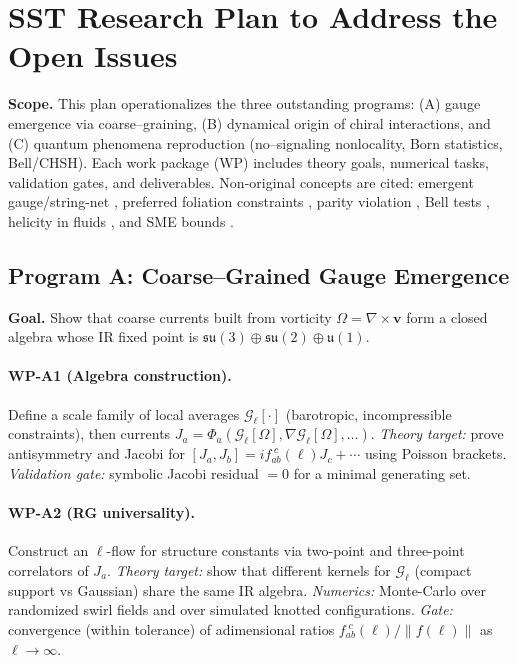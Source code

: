 \documentclass[smallextended]{svjour3}       %
\begin{document}
\section{SST Research Plan to Address the Open Issues}
\label{sec:sst_research_plan}

    \noindent\textbf{Scope.} This plan operationalizes the three outstanding programs:
    (A) gauge emergence via coarse–graining, (B) dynamical origin of chiral interactions, and (C) quantum phenomena reproduction
    (no–signaling nonlocality, Born statistics, Bell/CHSH). Each work package (WP) includes theory goals, numerical tasks, validation gates, and deliverables. Non-original concepts are cited: emergent gauge/string-net \cite{LevinWen2005,Wen2013_Anomalies,Fradkin2013}, preferred foliation constraints \cite{JacobsonMattingly2001,Baker2017_GW170817,Creminelli2017_GW170817}, parity violation \cite{LeeYang1956,Wu1957}, Bell tests \cite{Bell1964,Aspect1982,Hensen2015,Giustina2015}, helicity in fluids \cite{Moffatt1969}, and SME bounds \cite{ColladayKostelecky1998}.

    \subsection*{Program A: Coarse–Grained Gauge Emergence}
    \textbf{Goal.} Show that coarse currents built from vorticity $\Omega=\nabla\times\mathbf{v}$ form a closed algebra whose IR fixed point is $\mathfrak{su}(3)\oplus\mathfrak{su}(2)\oplus\mathfrak{u}(1)$.

    \paragraph{WP-A1 (Algebra construction).}
    Define a scale family of local averages $\mathcal{G}_\ell[\cdot]$ (barotropic, incompressible constraints), then currents
    $J_a=\Phi_a(\mathcal{G}_\ell[\Omega],\nabla\mathcal{G}_\ell[\Omega],\ldots)$.
    \emph{Theory target:} prove antisymmetry and Jacobi for $[J_a,J_b]=i f^{\;c}_{ab}(\ell) J_c+\cdots$ using Poisson brackets.
    \emph{Validation gate:} symbolic Jacobi residual $=0$ for a minimal generating set.

    \paragraph{WP-A2 (RG universality).}
    Construct an $\ell$-flow for structure constants via two-point and three-point correlators of $J_a$.
    \emph{Theory target:} show that different kernels for $\mathcal{G}_\ell$ (compact support vs Gaussian) share the same IR algebra.
    \emph{Numerics:} Monte-Carlo over randomized swirl fields and over simulated knotted configurations.
    \emph{Gate:} convergence (within tolerance) of adimensional ratios $f_{ab}^{\;c}(\ell)/\|f(\ell)\|$ as $\ell\!\to\!\infty$.
\end{document}
